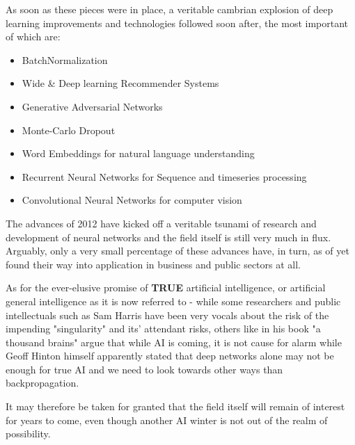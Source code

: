 As soon as these pieces were in place, a veritable cambrian explosion of deep learning improvements and technologies followed soon after, the most important of which are:

\begin{itemize}
	\item BatchNormalization
	\item Wide \& Deep learning Recommender Systems
	\item Generative Adversarial Networks 
	\item Monte-Carlo Dropout
	\item Word Embeddings for natural language understanding
	\item Recurrent Neural Networks for Sequence and timeseries processing
	\item Convolutional Neural Networks for computer vision
\end{itemize}

The advances of 2012 have kicked off a veritable tsunami of research and development of neural networks and the field itself is still very much in flux. Arguably, only a very small percentage of these advances have, in turn, as of yet found their way into application in business and public sectors at all.

As for the ever-elusive promise of \textbf{TRUE} artificial intelligence, or artificial general intelligence as it is now referred to - while some researchers and public intellectuals such as Sam Harris have been very vocals about the risk of the impending "singularity" and its' attendant risks, others like \cite{thousand} in his book "a thousand brains" argue that while \ac{AI} is coming, it is not cause for alarm while Geoff Hinton himself apparently stated that deep networks alone may not be enough for true \ac{AI} and we need to look towards other ways than backpropagation.

It may therefore be taken for granted that the field itself will remain of interest for years to come, even though another \ac{AI} winter is not out of the realm of possibility.
